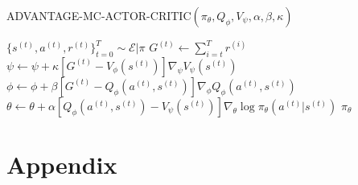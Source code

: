\documentclass[11pt]{article}
\begin{document}
\begin{algorithm}[H]
\caption{ADVANTAGE-MC-ACTOR-CRITIC$( \pi_\theta, Q_\phi, V_\psi, \alpha, \beta, \kappa)$}
\label{algo:Advantage-MC-AC}
\begin{algorithmic}[1]
\STATE $\{ s^{ (t)} , a^{(t)}, r^{(t)}\}_{t=0}^T \sim \mathcal{E}|\pi $
\STATE $G^{(t)} \leftarrow  \sum_{i=t}^T  r^{(i)}$
\STATE $\psi  \leftarrow \psi  + \kappa[G^{(t)}-V_\phi(s^{(t)})]\nabla_\psi V_\psi(s^{(t)})$
\STATE $\phi \leftarrow \phi + \beta[G^{(t)}-Q_\phi(a^{(t)},s^{ (t)} )] \nabla_\phi Q_\phi(a^ {(t)},s^{(t)}) $
\STATE $ \theta \leftarrow \theta+ \alpha [Q_\phi(a^{(t)},s^{(t)})-V_\psi(s^{(t)})]  \nabla_{\theta}\log{\pi_\theta(a^{(t)}|s^{(t)})}$
\ENDFOR
\ENDFOR 
\RETURN  $\pi_\theta$
\end{algorithmic}
\end{algorithm}

\nocite{*}
{


}

\section{Appendix}

\end{document}

